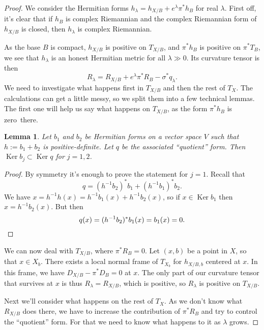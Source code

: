 \documentclass[10pt,a4paper]{amsart}
\newtheorem{lemm}[theo]{Lemma}
\theoremstyle{definition}
\DeclareMathOperator{\Ker}{Ker}
\def\kahler{complex Riemannian}
\begin{document}
\begin{proof}
We consider the Hermitian forms $h_{\lambda} = h_{X/B} + e^{\lambda} \pi^{*} h_{B}$ for real $\lambda$.
First off, it's clear that if $h_{B}$ is \kahler{} and the \kahler{} form of $h_{X/B}$ is closed, then $h_{\lambda}$ is \kahler{}.

As the base $B$ is compact, $h_{X/B}$ is positive on $T_{X/B}$, and $\pi^{*}h_{B}$ is positive on $\pi^{*}T_{B}$, we see that $h_{\lambda}$ is an honest Hermitian metric for all $\lambda \gg 0$.
Its curvature tensor is then
\[
  R_{\lambda}
  = R_{X/B} + e^{\lambda}\pi^{*}R_{B} - \sigma^{*}q_{\lambda}.
\]
We need to investigate what happens first in $T_{X/B}$ and then the rest of $T_{X}$.
The calculations can get a little messy, so we split them into a few technical lemmas.
The first one will help us say what happens on $T_{X/B}$, as the form
$\pi^{*}h_{B}$ is zero~there.%


\begin{lemm}
Let $b_{1}$ and $b_{2}$ be Hermitian forms on a vector space $V$ such that $h := b_{1} + b_{2}$ is positive-definite.
Let $q$ be the associated ``quotient'' form.
Then $\Ker b_{j} \subset \Ker q$ for $j = 1,2$.
\end{lemm}

\begin{proof}
By symmetry it's enough to prove the statement for $j = 1$.
Recall that
\[
  q = (h^{-1}b_{2})^{*}b_{1} + (h^{-1}b_{1})^{*}b_{2}.
\]
We have $x = h^{-1}h(x) = h^{-1}b_{1}(x) + h^{-1}b_{2}(x)$, so if $x \in \Ker b_{1}$ then $x = h^{-1}b_{2}(x)$.
But then
\begin{equation*}
q(x) = (h^{-1}b_{2})^{*}b_{1}(x) = b_{1}(x) = 0.
\qedhere
\end{equation*}
\end{proof}

We can now deal with $T_{X/B}$, where $\pi^*R_B = 0$.
Let $(x,b)$ be a point in $X$, so that $x \in X_b$.
There exists a local normal frame of $T_{X_b}$ for $h_{X/B,b}$ centered at $x$.
In this frame, we have $D_{X/B} - \pi^* D_B = 0$ at $x$.
The only part of our curvature tensor that survives at $x$ is thus
$R_\lambda = R_{X/B}$,
which is positive, so $R_\lambda$ is positive on $T_{X/B}$.

Next we'll consider what happens on the rest of $T_{X}$.
As we don't know what $R_{X/B}$ does there, we have to increase the contribution of $\pi^{*}R_{B}$ and try to control the ``quotient'' form.
For that we need to know what happens to it as $\lambda$ grows.




\end{proof}
\end{document}
